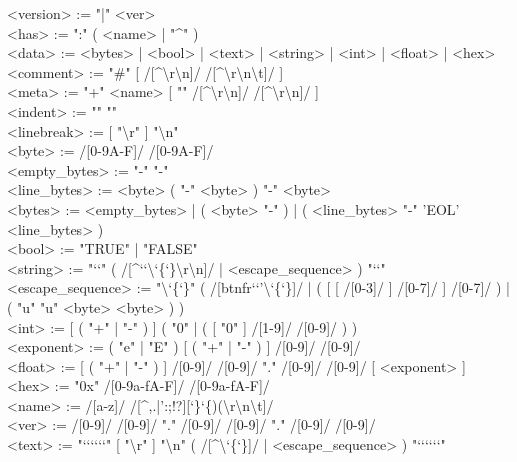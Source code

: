 \documentclass{article}
\begin{document}
\begin{ebnf}[8em]
<version> := "|" <ver> \\
<has> := ":" ( <name> | "\^{}" ) \\
<data> := <bytes> | <bool> | <text> | <string> | <int> | <float> | <hex> \\
<comment> := "\#" [ { /[\^{}\textbackslash{}r\textbackslash{}n]/ } /[\^{}\textvisiblespace{}\textbackslash{}r\textbackslash{}n\textbackslash{}t]/ ] \\
<meta> := "+" <name> [ "\textvisiblespace{}" /[\^{}\textbackslash{}r\textbackslash{}n]/ { /[\^{}\textbackslash{}r\textbackslash{}n]/ } ] \\
<indent> := "\textvisiblespace{}" "\textvisiblespace{}" \\
<linebreak> := [ "\textbackslash{}r" ] "\textbackslash{}n" \\
<byte> := /[0-9A-F]/ /[0-9A-F]/ \\
<empty\_bytes> := "-" "-" \\
<line\_bytes> := <byte> ( "-" <byte> ) { "-" <byte> } \\
<bytes> := <empty\_bytes> | ( <byte> "-" ) | ( <line\_bytes> { "-" 'EOL' <line\_bytes> } ) \\
<bool> := "TRUE" | "FALSE" \\
<string> := "\lq\lq" { ( /[\^{}\lq\lq\textbackslash\char`\{\char`\}\textbackslash{}r\textbackslash{}n]/ | <escape\_sequence> ) } "\lq\lq" \\
<escape\_sequence> := "\textbackslash\char`\{\char`\}" ( /[btnfr\lq\lq'\textbackslash\char`\{\char`\}]/ | ( [ [ /[0-3]/ ] /[0-7]/ ] /[0-7]/ ) | ( "u" { "u" } <byte> <byte> ) ) \\
<int> := [ ( "+" | "-" ) ] ( "0" | ( [ "0" ] /[1-9]/ { /[0-9]/ } ) ) \\
<exponent> := ( "e" | "E" ) [ ( "+" | "-" ) ] /[0-9]/ { /[0-9]/ } \\
<float> := [ ( "+" | "-" ) ] /[0-9]/ { /[0-9]/ } "." /[0-9]/ { /[0-9]/ } [ <exponent> ] \\
<hex> := "0x" /[0-9a-fA-F]/ { /[0-9a-fA-F]/ } \\
<name> := /[a-z]/ { /[\^{}\textvisiblespace{},.|':;!?][\char`\}\char`\{)(\textbackslash{}r\textbackslash{}n\textbackslash{}t]/ } \\
<ver> := /[0-9]/ { /[0-9]/ } "." /[0-9]/ { /[0-9]/ } "." /[0-9]/ { /[0-9]/ } \\
<text> := "\lq\lq\lq\lq\lq\lq" [ "\textbackslash{}r" ] "\textbackslash{}n" { ( /[\^{}\textbackslash\char`\{\char`\}]/ | <escape\_sequence> ) } "\lq\lq\lq\lq\lq\lq" \\


\end{ebnf}
\end{document}
